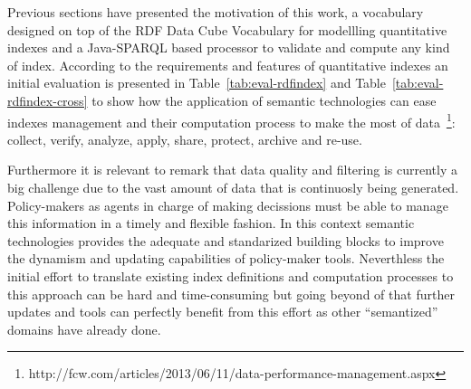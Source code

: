 Previous sections have presented the motivation of this work, a vocabulary designed on top of the 
RDF Data Cube Vocabulary for modellling quantitative indexes and a Java-SPARQL based processor 
to validate and compute any kind of index. According to the requirements and features 
of quantitative indexes an initial evaluation is presented in Table~\ref{tab:eval-rdfindex} and Table~\ref{tab:eval-rdfindex-cross} 
to show how the application of semantic technologies can ease indexes management and their computation process 
to make the most of data~\footnote{http://fcw.com/articles/2013/06/11/data-performance-management.aspx}: 
collect, verify, analyze, apply, share, protect, archive and re-use.

Furthermore it is relevant to remark that data quality and filtering is currently a big challenge 
due to the vast amount of data that is continuosly being generated. Policy-makers as agents in charge 
of making decissions must be able to manage
this information in a timely and flexible fashion. In this context semantic technologies provides the adequate and standarized building blocks to improve the dynamism and updating capabilities of policy-maker tools. Neverthless 
the initial effort to translate existing index definitions and computation processes to this approach can 
be hard and time-consuming but going beyond of that further updates and tools can perfectly benefit from this effort as 
other ``semantized'' domains have already done.

